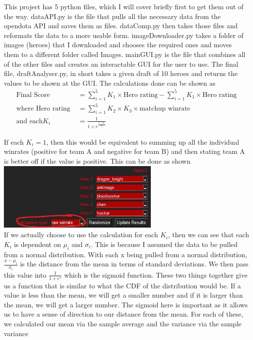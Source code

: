 \documentclass{article}
\begin{document}
	This project has 5 python files, which I will cover briefly first to get them out of the way. dataAPI.py is the file that pulls all the necessary data from the opendota API and saves them as files. dataComp.py then takes those files and reformats the data to a more usable form. imageDownloader.py takes a folder of images (heroes) that I downloaded and chooses the required ones and moves them to a different folder called Images. mainGUI.py is the file that combines all of the other files and creates an interactable GUI for the user to use. The final file, draftAnalyser.py, in short takes a given draft of 10 heroes and returns the values to be shown at the GUI. The calculations done can be shown as 
\begin{align*}
\text{Final Score} &= \sum_{i=1}^5 K_1 \times \text{Hero rating} - \sum_{i=1}^5 K_1 \times \text{Hero rating} \\
\text{where Hero rating } &= \sum_{i=1}^5 K_2\times K_3 \times \text{matchup winrate} \\
\text{and each} K_i &= \frac{1}{1+e^{\frac{x-\mu_i}{\sigma_i}}}
\end{align*}

If each $K_i=1$, then this would be equivalent to summing up all the individual winrates (positive for team A and negative for team B) and then stating team A is better off if the value is positive. This can be done as shown \\
\includegraphics[width=8cm]{raw winrate}
\\

If we actually choose to use the calculation for each $K_i$, then we can see that each $K_i$ is dependent on $\mu_i$ and $\sigma_i$. This is because I assumed the data to be pulled from a normal distribution. With each x being pulled from a normal distribution, $\frac{x-\mu_i}{\sigma_i}$ is the distance from the mean in terms of standard deviations. We then pass this value into $\frac{1}{1+e^{s}}$ which is the sigmoid function. These two things together give us a function that is similar to what the CDF of the distribution would be. If a value is less than the mean, we will get a smaller number and if it is larger than the mean, we will get a larger number. The sigmoid here is important as it allows us to have a sense of direction to our distance from the mean. For each of these, we calculated our mean via the sample average and the variance via the sample variance \\
\end{document}
